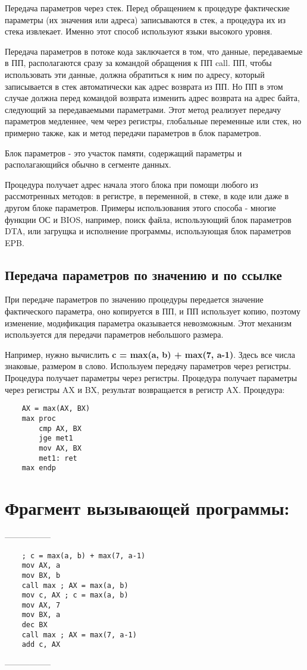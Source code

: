 Передача параметров через стек. Перед обращением к процедуре фактические параметры (их значения или адреса) записываются в стек, а процедура их из стека извлекает.
Именно этот способ используют языки высокого уровня.

Передача параметров в потоке кода заключается в том, что данные, передаваемые в ПП, располагаются сразу за командой обращения к ПП call.
ПП, чтобы использовать эти данные, должна обратиться к ним по адресу, который записывается в стек автоматически как адрес возврата из ПП.
Но ПП в этом случае должна перед командой возврата изменить адрес возврата на адрес байта, следующий за передаваемыми параметрами. Этот метод реализует передачу
параметров медленнее, чем через регистры, глобальные переменные или стек, но примерно также, как и метод передачи параметров в блок параметров.

Блок параметров - это участок памяти, содержащий параметры и располагающийся обычно в сегменте данных.

Процедура получает адрес начала этого блока при помощи любого из рассмотренных методов: в регистре, в переменной, в стеке, в коде или даже в другом блоке параметров.
Примеры использования этого способа - многие функции ОС и BIOS, например, поиск файла, использующий блок параметров DTA, или загрущка и исполнение программы, использующая блок параметров EPB.

\subsection{Передача параметров по значению и по ссылке}

При передаче параметров по значению процедуры передается значение фактического параметра, оно копируется в ПП, и ПП использует копию, поэтому изменение, модификация параметра
оказывается невозможным. Этот механизм используется для передачи параметров небольшого размера.

Например, нужно вычислить \textbf{c = max(a, b) + max(7, a-1)}. Здесь все числа знаковые, размером в слово. Используем передачу параметров через регистры. Процедура получает параметры через
регистры. Процедура получает параметры через регистры AX и BX, результат возвращается в регистр AX.
Процедура:
\begin{verbatim}
    AX = max(AX, BX)
    max proc
        cmp AX, BX
        jge met1
        mov AX, BX
        met1: ret
    max endp
\end{verbatim}

\section{Фрагмент вызывающей программы:}
-----------------
\begin{verbatim}
    ; c = max(a, b) + max(7, a-1)
    mov AX, a
    mov BX, b
    call max ; AX = max(a, b)
    mov c, AX ; c = max(a, b)
    mov AX, 7
    mov BX, a
    dec BX
    call max ; AX = max(7, a-1)
    add c, AX
\end{verbatim}
-----------------

